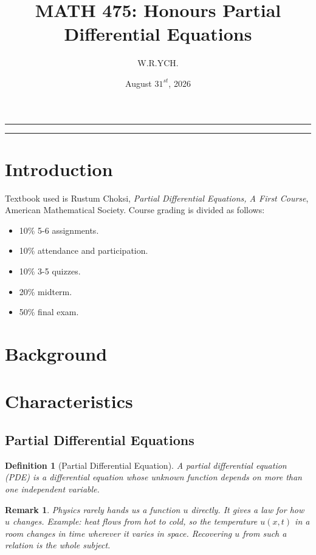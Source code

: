 \documentclass{article}
\newtheorem{definition}{Definition}
\newtheorem{remark}{Remark}
\begin{document}
\title{MATH 475: Honours Partial Differential Equations}
\author{W.R.YCH.}
\date{August \(31^{st}\), 2026}
\setcounter{Maxaffil}{0}
\renewcommand\Affilfont{\itshape\small}
\maketitle
\noindent\rule{\textwidth}{0.4pt}
\thispagestyle{empty}
\begin{abstract}
\end{abstract}
\noindent\rule{\textwidth}{0.4pt}
\clearpage
\pagestyle{empty}
{
  \hypersetup{linkcolor=black}
  \tableofcontents
}
\clearpage
\pagestyle{plain}
\setcounter{page}{1}


\section{Introduction}
Textbook used is Rustum Choksi, \emph{Partial Differential Equations, A First Course}, American Mathematical Society. Course grading is divided as follows:
\begin{itemize}
    \item 10\% 5-6 assignments.
    \item 10\% attendance and participation.
    \item 10\% 3-5 quizzes.
    \item 20\% midterm.
    \item 50\% final exam.
\end{itemize}


\section{Background}


\section{Characteristics}
\subsection{Partial Differential Equations}
\begin{definition}[Partial Differential Equation]
    A partial differential equation (PDE) is a differential equation whose unknown function depends on more than one independent variable.
\end{definition}
\begin{remark}
    Physics rarely hands us a function $u$ directly. It gives a law for how $u$ changes. Example: heat flows from hot to cold, so the temperature $u(x,t)$ in a room changes in time wherever it varies in space. Recovering $u$ from such a relation is the whole subject.
\end{remark}
\end{document}
